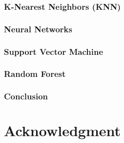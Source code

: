 \documentclass[conference]{IEEEtran}
\begin{document}
\subsubsection{K-Nearest Neighbors (KNN)}
\subsubsection{Neural Networks}
\subsubsection{Support Vector Machine}
\subsubsection{Random Forest}
\subsubsection{Conclusion}


\section*{Acknowledgment}
\vspace{12pt}


\end{document}
